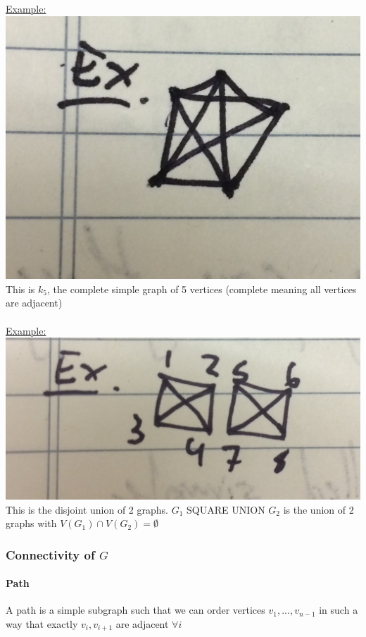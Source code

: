 \documentclass[12pt]{article}
\begin{document}
\underline{Example:}\\
\includegraphics[scale=0.3]{lec3-3}\\
This is $k_5$, the complete simple graph of 5 vertices (complete meaning all vertices are adjacent)\\
\\
\underline{Example:}\\
\includegraphics[scale=0.22]{lec3-4}\\
This is the disjoint union of 2 graphs. $G_1 $ SQUARE UNION $ G_2$ is the union of 2 graphs with $V(G_1) \cap V(G_2) = \emptyset$

\subsubsection{Connectivity of $G$}

\paragraph{Path} A path is a simple subgraph such that we can order vertices $v_1, ... ,v_{n-1}$ in such a way that exactly $v_i, v_{i+1}$ are adjacent $\forall i$
\end{document}
